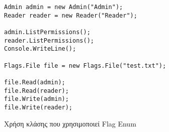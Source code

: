 \begin{listing}[htbp]
\begin{verbatim}
Admin admin = new Admin("Admin");
Reader reader = new Reader("Reader");

admin.ListPermissions();
reader.ListPermissions();
Console.WriteLine();

Flags.File file = new Flags.File("test.txt");

file.Read(admin);
file.Read(reader);
file.Write(admin);
file.Write(reader);
\end{verbatim}
\caption{Χρήση κλάσης που χρησιμοποιεί Flag Enum}
\label{flagExec}
\end{listing}